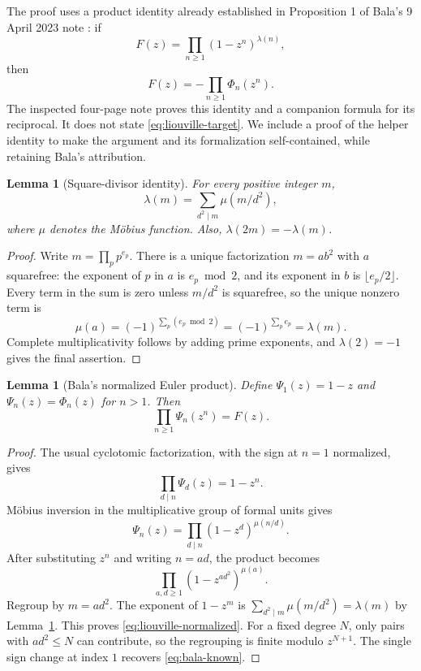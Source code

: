 \documentclass[11pt]{article}
\newtheorem{lemma}[theorem]{Lemma}
\begin{document}
The proof uses a product identity already established in Proposition 1 of
Bala's 9 April 2023 note \cite{bala2023}: if
\[
 F(z)=\prod_{n\ge1}(1-z^n)^{\lambda(n)},
\]
then
\begin{equation}\label{eq:bala-known}
 F(z)=-\prod_{n\ge1}\Phi_n(z^n).
\end{equation}
The inspected four-page note proves this identity and a companion
formula for its reciprocal. It does not state
\eqref{eq:liouville-target}. We include a proof of the helper identity to
make the argument and its formalization self-contained, while retaining
Bala's attribution.

\begin{lemma}[Square-divisor identity]\label{lem:liouville-square}
For every positive integer $m$,
\begin{equation}\label{eq:liouville-square}
 \lambda(m)=\sum_{d^2\mid m}\mu(m/d^2),
\end{equation}
where $\mu$ denotes the M\"obius function. Also,
$\lambda(2m)=-\lambda(m)$.
\end{lemma}

\begin{proof}
Write $m=\prod_p p^{e_p}$. There is a unique factorization
$m=ab^2$ with $a$ squarefree: the exponent of $p$ in $a$ is
$e_p\bmod2$, and its exponent in $b$ is $\lfloor e_p/2\rfloor$.
Every term in the sum is zero unless $m/d^2$ is squarefree, so the unique
nonzero term is
\[
 \mu(a)=(-1)^{\sum_p(e_p\bmod2)}
        =(-1)^{\sum_p e_p}=\lambda(m).
\]
Complete multiplicativity follows by adding prime exponents, and
$\lambda(2)=-1$ gives the final assertion.
\end{proof}

\begin{lemma}[Bala's normalized Euler product]\label{lem:liouville-bala}
Define $\Psi_1(z)=1-z$ and $\Psi_n(z)=\Phi_n(z)$ for $n>1$.
Then
\begin{equation}\label{eq:liouville-normalized}
 \prod_{n\ge1}\Psi_n(z^n)=F(z).
\end{equation}
\end{lemma}

\begin{proof}
The usual cyclotomic factorization, with the sign at $n=1$ normalized,
gives
\[
 \prod_{d\mid n}\Psi_d(z)=1-z^n.
\]
M\"obius inversion in the multiplicative group of formal units gives
\begin{equation}\label{eq:liouville-mobius}
 \Psi_n(z)=\prod_{d\mid n}(1-z^d)^{\mu(n/d)}.
\end{equation}
After substituting $z^n$ and writing $n=ad$, the product becomes
\[
 \prod_{a,d\ge1}(1-z^{ad^2})^{\mu(a)}.
\]
Regroup by $m=ad^2$. The exponent of $1-z^m$ is
$\sum_{d^2\mid m}\mu(m/d^2)=\lambda(m)$ by
Lemma~\ref{lem:liouville-square}. This proves
\eqref{eq:liouville-normalized}. For a fixed degree $N$, only pairs with
$ad^2\le N$ can contribute, so the regrouping is finite modulo
$z^{N+1}$. The single sign change at index $1$ recovers
\eqref{eq:bala-known}.
\end{proof}
\end{document}
